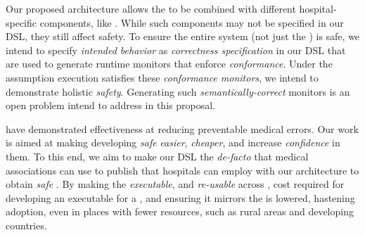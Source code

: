 Our proposed architecture allows the \BPGLogic{} to be combined with different
hospital-specific components, like \GUIs. While such components may not be specified
in our DSL, they still affect safety. To ensure the entire system
(not just the \BPGLogic{}) is safe, we intend to specify \emph{intended behavior}
as \emph{correctness specification} in our DSL that are used to generate
runtime monitors that enforce \emph{conformance}. Under the assumption
execution satisfies these \emph{conformance monitors}, we intend to
demonstrate holistic \emph{safety}. Generating
such \emph{semantically-correct} monitors is an open problem intend to address in this
proposal.



%

\noindent \CGSs{} have demonstrated effectiveness at reducing preventable
medical errors. Our work is aimed at making developing \emph{safe} \CGSs{}
\emph{easier}, \emph{cheaper}, and increase \HCP{} \emph{confidence} in them.
To this end, we aim to make our DSL the \emph{de-facto}
that medical associations can use to publish \BPGs{} that hospitals can employ
with our architecture to obtain \emph{safe} \CGSs{}. By making the
\BPG{} \emph{executable}, and \emph{re-usable} across \CGSs{},
cost required for developing an executable \BPGLogic{} for a \BPG, and ensuring
it mirrors the \BPG{} is lowered, hastening \CGSs{} adoption,
even in places with fewer resources, such as rural areas and developing
countries.


